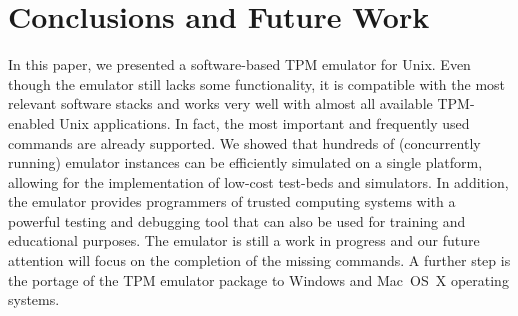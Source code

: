 \documentclass[runningheads]{llncs}
\begin{document}

\section{Conclusions and Future Work}\label{sec:conclusion}
In this paper, we presented a software-based TPM emulator for Unix. Even
though the emulator still lacks some functionality, it is compatible with
the most relevant software stacks and works very well with almost all
available TPM-enabled Unix applications. In fact, the most important and
frequently used commands are already supported. We showed that hundreds of
(concurrently running) emulator instances can be efficiently simulated on
a single platform, allowing for the implementation of low-cost test-beds
and simulators. In addition, the emulator provides programmers of trusted
computing systems with a powerful testing and debugging tool that can also
be used for training and educational purposes.
The emulator is still a work in progress and our future attention will
focus on the completion of the missing commands. A further step is the portage
of the TPM emulator package to Windows and Mac~OS~X operating systems.

\end{document}
